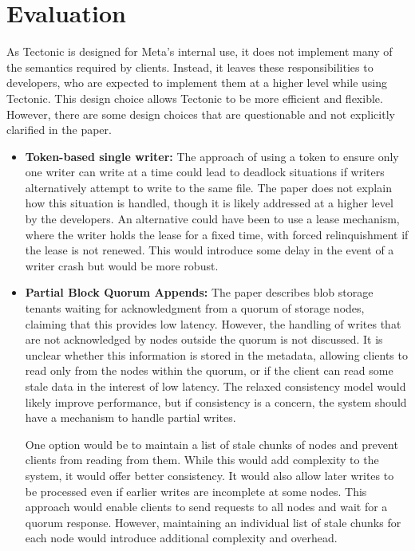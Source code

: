 \section{Evaluation}

As Tectonic is designed for Meta's internal use, it does not implement many of the semantics required by clients. Instead, it leaves these responsibilities to developers, who are expected to implement them at a higher level while using Tectonic. This design choice allows Tectonic to be more efficient and flexible. However, there are some design choices that are questionable and not explicitly clarified in the paper.

\begin{itemize}
    \item \textbf{Token-based single writer:} The approach of using a token to ensure only one writer can write at a time could lead to deadlock situations if writers alternatively attempt to write to the same file. The paper does not explain how this situation is handled, though it is likely addressed at a higher level by the developers. An alternative could have been to use a lease mechanism, where the writer holds the lease for a fixed time, with forced relinquishment if the lease is not renewed. This would introduce some delay in the event of a writer crash but would be more robust.
    
    \item \textbf{Partial Block Quorum Appends:} The paper describes blob storage tenants waiting for acknowledgment from a quorum of storage nodes, claiming that this provides low latency. However, the handling of writes that are not acknowledged by nodes outside the quorum is not discussed. It is unclear whether this information is stored in the metadata, allowing clients to read only from the nodes within the quorum, or if the client can read some stale data in the interest of low latency. The relaxed consistency model would likely improve performance, but if consistency is a concern, the system should have a mechanism to handle partial writes.

    One option would be to maintain a list of stale chunks of nodes and prevent clients from reading from them. While this would add complexity to the system, it would offer better consistency. It would also allow later writes to be processed even if earlier writes are incomplete at some nodes. This approach would enable clients to send requests to all nodes and wait for a quorum response. However, maintaining an individual list of stale chunks for each node would introduce additional complexity and overhead.


\end{itemize}

